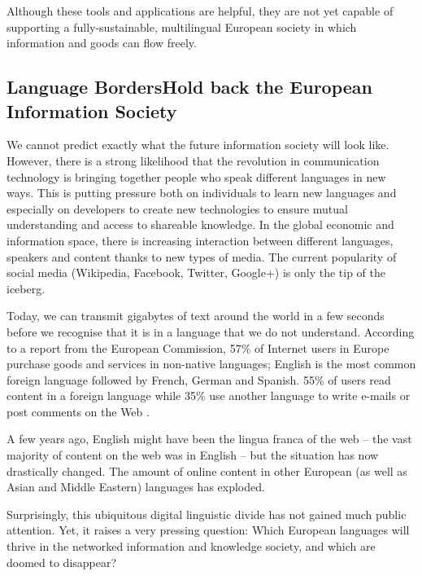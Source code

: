 \begin{multicols}{2}
Although these tools and applications are helpful, they are not yet capable of supporting a fully-sustainable, multilingual European society in which information and goods can flow freely.

\subsection[Language Borders Hold back the European Information Society]{Language Borders\newline Hold back the European Information Society}

We cannot predict exactly what the future information society will look like. However, there is a strong likelihood that the revolution in communication technology is bringing together people who speak different languages in new ways. This is putting pressure both on individuals to learn new languages and especially on developers to create new technologies to ensure mutual understanding and access to shareable knowledge. In the global economic and information space, there is increasing interaction between different languages, speakers and content thanks to new types of media. The current popularity of social media (Wikipedia, Facebook, Twitter, Google+) is only the tip of the iceberg.


Today, we can transmit gigabytes of text around the world in a few
seconds before we recognise that it is in a language that we do not
understand. According to a report from the European Commission, 57\%
of Internet users in Europe purchase goods and services in non-native
languages; English is the most common foreign language followed by
French, German and Spanish. 55\% of users read content in a foreign
language while 35\% use another language to write e-mails or post
comments on the Web \cite{EC1}. 

A few years ago, English might have been the lingua franca of the web -- the vast majority of content on the web was in English -- but the situation has now drastically changed. The amount of online content in other European (as well as Asian and Middle Eastern) languages has exploded.

Surprisingly, this ubiquitous digital linguistic divide has not gained much public attention. Yet, it raises a very pressing question: Which European languages will thrive in the networked information and knowledge society, and which are doomed to disappear?



\end{multicols}
